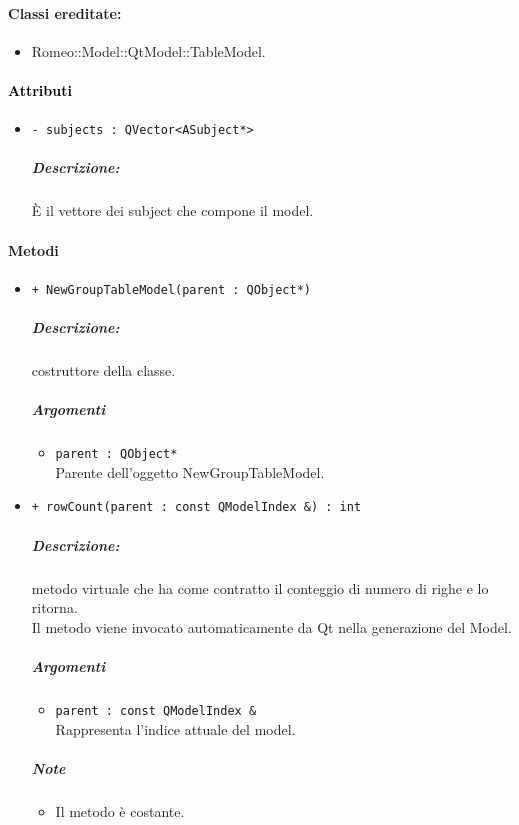 {\paragraph{Classi ereditate:}
\begin{itemize}
	\item Romeo::Model::QtModel::TableModel.
\end{itemize}

\paragraph{\textcolor{black}{Attributi\\}}
	\begin{itemize}
		\item \color{teal}\verb!- subjects : QVector<ASubject*>!
		\color{black}
		\subparagraph{Descrizione:} È il vettore dei subject\g{} che compone il model.
	\end{itemize}
	
\paragraph{\color{black}Metodi\\}
\begin{itemize}
	\item \color{blue}\verb!+ NewGroupTableModel(parent : QObject*)!\\
		\color{black}
		\subparagraph{Descrizione:} costruttore della classe.\\
		\subparagraph{Argomenti}
			\begin{itemize}
				\item \color{RoyalPurple}\verb!parent : QObject*!\\
				\color{Black}Parente dell'oggetto NewGroupTableModel.
			\end{itemize}
			
	\item \color{blue}\verb!+ rowCount(parent : const QModelIndex &) : int!\\
	\color{black}
	\subparagraph{Descrizione:} metodo virtuale che ha come contratto il conteggio di numero di righe e lo ritorna.
	\\Il metodo viene invocato automaticamente da Qt\g{} nella generazione del Model.\\
	\subparagraph{Argomenti}
		\begin{itemize}
			\item \color{RoyalPurple}\verb!parent : const QModelIndex &!\\
			\color{Black}Rappresenta l'indice attuale del model.
		\end{itemize}
	\subparagraph{Note}
			\begin{itemize}
				\item Il metodo è costante.
			\end{itemize}
	

\end{itemize}}
